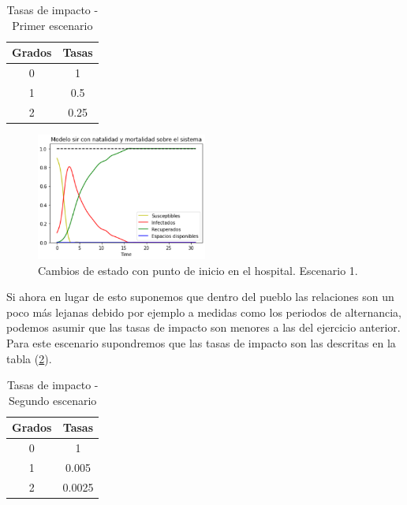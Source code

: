 \newpage

\begin{table}[h]
\begin{center}
\begin{tabular}{| c | c |}
\hline
Grados & Tasas \\ \hline
0 & 1 \\
1 & 0.5 \\
2 & 0.25 \\\hline
\end{tabular}
\caption{Tasas de impacto - Primer escenario}
\label{tab:tasasDeImpacto1}
\end{center}
\end{table}

\begin{figure}[h]
  \centering
    \includegraphics[width=0.5\textwidth]{Imagenes/metricas1.PNG}
    \caption{Cambios de estado con punto de inicio en el hospital. Escenario 1.}
    \label{fig:metricas1}
\end{figure}

Si ahora en lugar de esto suponemos que dentro del pueblo las relaciones son un poco más lejanas debido por ejemplo a medidas como los periodos de alternancia, podemos asumir que las tasas de impacto son menores a las del ejercicio anterior. Para este escenario supondremos que las tasas de impacto son las descritas en la tabla (\ref{tab:tasasDeImpacto2}).

\begin{table}[h]
\begin{center}
\begin{tabular}{| c | c |}
\hline
Grados & Tasas \\ \hline
0 & 1 \\
1 & 0.005 \\
2 & 0.0025 \\\hline
\end{tabular}
\caption{Tasas de impacto - Segundo escenario}
\label{tab:tasasDeImpacto2}
\end{center}
\end{table}

